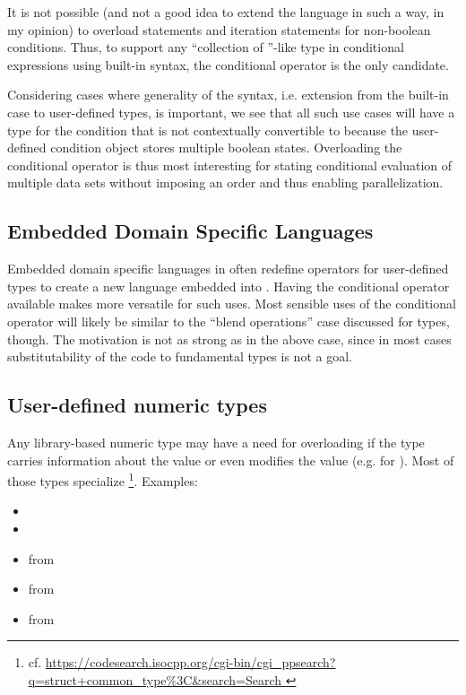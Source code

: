 It is not possible (and not a good idea to extend the language in such a way, in my opinion) to overload  statements and iteration statements for non-boolean conditions.
Thus, to support any “collection of \bool{}”-like type in conditional expressions using built-in syntax, the conditional operator is the only candidate.

Considering cases where generality of the syntax, i.e. extension from the built-in case to user-defined types, is important, we see that all such use cases will have a type for the condition that is not contextually convertible to \bool because the user-defined condition object stores multiple boolean states.
Overloading the conditional operator is thus most interesting for stating conditional evaluation of multiple data sets without imposing an order and thus enabling parallelization.

\subsection{Embedded Domain Specific Languages}
Embedded domain specific languages in \CC{} often redefine operators for user-defined types to create a new language embedded into \CC{}.
Having the conditional operator available makes \CC{} more versatile for such uses.
Most sensible uses of the conditional operator will likely be similar to the “blend operations” case discussed for  types, though.
The motivation is not as strong as in the above case, since in most cases substitutability of the code to fundamental types is not a goal.

\subsection{User-defined numeric types}
Any library-based numeric type may have a need for overloading  if the type carries information about the value or even modifies the value (e.g. for ).
Most of those types specialize \footnote{cf. \url{https://codesearch.isocpp.org/cgi-bin/cgi_ppsearch?q=struct+common_type\%3C&search=Search
}}.
Examples:
\begin{itemize}
  \item {}
  \item {}
  \item {} from \cite{P1050R0}
  \item {} from \cite{P0037R5}
  \item {} from \cite{site.bounded-integer}
\end{itemize}

